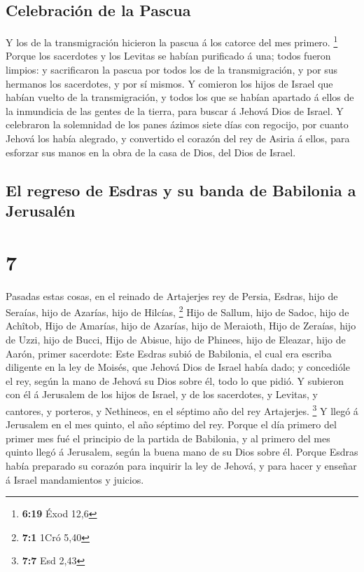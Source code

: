 \hypertarget{celebraciuxf3n-de-la-pascua}{%
\subsection{Celebración de la
Pascua}\label{celebraciuxf3n-de-la-pascua}}

 Y los de la transmigración hicieron la pascua á los
catorce del mes primero. \footnote{\textbf{6:19} Éxod 12,6}
 Porque los sacerdotes y los Levitas se habían purificado
á una; todos fueron limpios: y sacrificaron la pascua por todos los de
la transmigración, y por sus hermanos los sacerdotes, y por sí mismos.
 Y comieron los hijos de Israel que habían vuelto de la
transmigración, y todos los que se habían apartado á ellos de la
inmundicia de las gentes de la tierra, para buscar á Jehová Dios de
Israel.  Y celebraron la solemnidad de los panes ázimos
siete días con regocijo, por cuanto Jehová los había alegrado, y
convertido el corazón del rey de Asiria á ellos, para esforzar sus manos
en la obra de la casa de Dios, del Dios de Israel.

\hypertarget{el-regreso-de-esdras-y-su-banda-de-babilonia-a-jerusaluxe9n}{%
\subsection{El regreso de Esdras y su banda de Babilonia a
Jerusalén}\label{el-regreso-de-esdras-y-su-banda-de-babilonia-a-jerusaluxe9n}}

\hypertarget{section-6}{%
\section{7}\label{section-6}}

 Pasadas estas cosas, en el reinado de Artajerjes rey de
Persia, Esdras, hijo de Seraías, hijo de Azarías, hijo de Hilcías,
\footnote{\textbf{7:1} 1Cró 5,40}  Hijo de Sallum, hijo de
Sadoc, hijo de Achîtob,  Hijo de Amarías, hijo de Azarías,
hijo de Meraioth,  Hijo de Zeraías, hijo de Uzzi, hijo de
Bucci,  Hijo de Abisue, hijo de Phinees, hijo de Eleazar,
hijo de Aarón, primer sacerdote:  Este Esdras subió de
Babilonia, el cual era escriba diligente en la ley de Moisés, que Jehová
Dios de Israel había dado; y concedióle el rey, según la mano de Jehová
su Dios sobre él, todo lo que pidió.  Y subieron con él á
Jerusalem de los hijos de Israel, y de los sacerdotes, y Levitas, y
cantores, y porteros, y Nethineos, en el séptimo año del rey Artajerjes.
\footnote{\textbf{7:7} Esd 2,43}  Y llegó á Jerusalem en
el mes quinto, el año séptimo del rey.  Porque el día
primero del primer mes fué el principio de la partida de Babilonia, y al
primero del mes quinto llegó á Jerusalem, según la buena mano de su Dios
sobre él.  Porque Esdras había preparado su corazón para
inquirir la ley de Jehová, y para hacer y enseñar á Israel mandamientos
y juicios.

